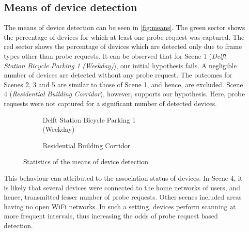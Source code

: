 \subsection{Means of device detection}
The means of device detection can be seen in \autoref{fig:means}. The green sector shows the percentage of devices for which at least one probe request was captured. The red sector shows the percentage of devices which are detected only due to frame types other than probe requests. It can be observed that for Scene 1 (\textit{Delft Station Bicycle Parking 1 (Weekday)}), our initial hypothesis fails. A negligible number of devices are detected without any probe request. The outcomes for Scenes 2, 3 and 5 are similar to those of Scene 1, and hence, are excluded. Scene 4 (\textit{Residential Building Corridor}), however, supports our hypothesis. Here, probe requests were not captured for a significant number of detected devices.\\
\begin{figure}[h!]
    \centering
    \captionsetup[subfigure]{justification=centering}
    \captionsetup{justification=centering}
    \begin{subfigure}{0.5\textwidth}
        
        \caption{Delft Station Bicycle Parking 1\\(Weekday)}
    \end{subfigure}
    \begin{subfigure}{0.5\textwidth}
        
        \caption{Residential Building Corridor}
    \end{subfigure}
    \caption{Statistics of the means of device detection}
    \label{fig:means}
\end{figure}

This behaviour can attributed to the association status of devices. In Scene 4, it is likely that several devices were connected to the home networks of users, and hence, transmitted lesser number of probe requests. Other scenes included areas having no open WiFi networks. In such a setting, devices perform scanning at more frequent intervals, thus increasing the odds of probe request based detection.

